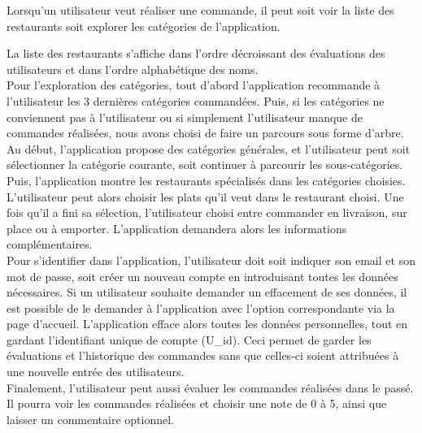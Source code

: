 \documentclass[10pt, a4paper]{article}
\begin{document}
Lorsqu'un utilisateur veut réaliser une commande, il peut soit voir la liste des restaurants soit explorer les catégories de l'application.

La liste des restaurants s'affiche dans l'ordre décroissant des évaluations des utilisateurs et dans l'ordre alphabétique des noms. \\

Pour l'exploration des catégories, tout d'abord l'application recommande à l'utilisateur les 3 dernières catégories
commandées. Puis, si les catégories ne conviennent pas à l'utilisateur ou si simplement l'utilisateur manque de commandes
réalisées, nous avons choisi de faire un parcours sous forme d'arbre. Au début, l'application propose des catégories générales, et
l'utilisateur peut soit sélectionner la catégorie courante, soit continuer à parcourir les sous-catégories. Puis, l'application montre
les restaurants spécialisés dans les catégories choisies. \\

L'utilisateur peut alors choisir les plats qu'il veut dans le restaurant choisi. Une fois qu'il a fini sa sélection, l'utilisateur
choisi entre commander en livraison, sur place ou à emporter. L'application demandera alors les informations complémentaires. \\

Pour s'identifier dans l'application, l'utilisateur doit soit indiquer son email et son mot de passe, soit créer un nouveau
compte en introduisant toutes les données nécessaires. Si un utilisateur souhaite demander un effacement de ses données,
il est possible de le demander à l'application avec l'option correspondante via la page d'accueil. L'application efface
alors toutes les données personnelles, tout en gardant l'identifiant unique de compte (U\_id). Ceci permet de garder les évaluations
et l'historique des commandes sans que celles-ci soient attribuées à une nouvelle entrée des utilisateurs. \\

Finalement, l'utilisateur peut aussi évaluer les commandes réalisées dans le passé. Il pourra voir les commandes réalisées
et choisir une note de 0 à 5, ainsi que laisser un commentaire optionnel.
\end{document}
